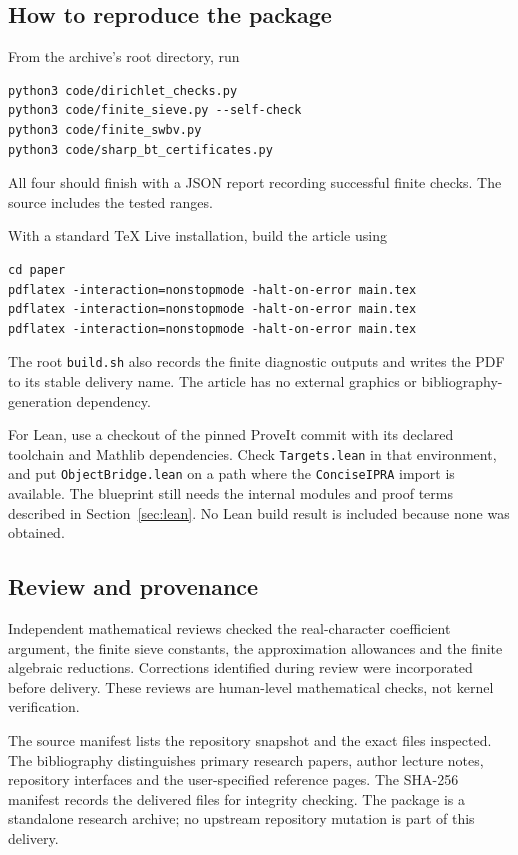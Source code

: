 \subsection{How to reproduce the package}

From the archive's root directory, run
\begin{lstlisting}
python3 code/dirichlet_checks.py
python3 code/finite_sieve.py --self-check
python3 code/finite_swbv.py
python3 code/sharp_bt_certificates.py
\end{lstlisting}
All four should finish with a JSON report recording successful finite
checks. The source includes the tested ranges.

With a standard TeX Live installation, build the article using
\begin{lstlisting}
cd paper
pdflatex -interaction=nonstopmode -halt-on-error main.tex
pdflatex -interaction=nonstopmode -halt-on-error main.tex
pdflatex -interaction=nonstopmode -halt-on-error main.tex
\end{lstlisting}
The root \texttt{build.sh} also records the finite diagnostic outputs
and writes the PDF to its stable delivery name. The article has no
external graphics or bibliography-generation dependency.

For Lean, use a checkout of the pinned ProveIt commit with its declared
toolchain and Mathlib dependencies. Check \texttt{Targets.lean} in that
environment, and put \texttt{ObjectBridge.lean} on a path where the
\texttt{ConciseIPRA} import is available. The blueprint still needs the
internal modules and proof terms described in Section~\ref{sec:lean}.
No Lean build result is included because none was obtained.

\subsection{Review and provenance}

Independent mathematical reviews checked the real-character coefficient
argument, the finite sieve constants, the approximation allowances and
the finite algebraic reductions. Corrections identified during review
were incorporated before delivery. These reviews are human-level
mathematical checks, not kernel verification.

The source manifest lists the repository snapshot and the exact files
inspected. The bibliography distinguishes primary research papers,
author lecture notes, repository interfaces and the user-specified
reference pages. The SHA-256 manifest records the delivered files for
integrity checking. The package is a standalone research archive; no
upstream repository mutation is part of this delivery.
